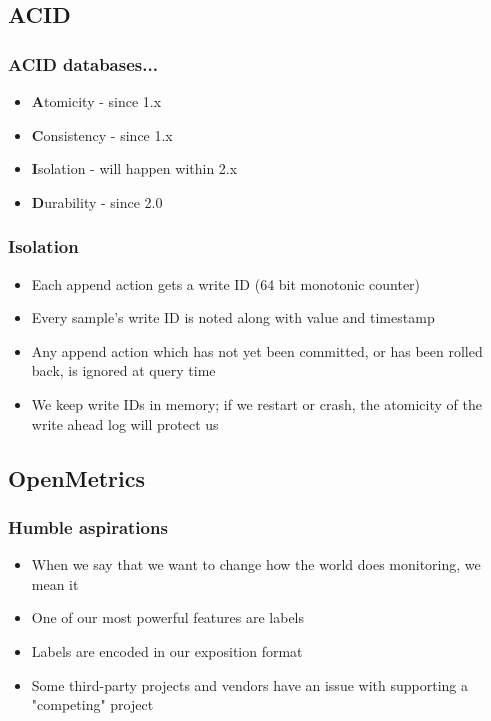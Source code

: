 \documentclass[aspectratio=169]{beamer}
\begin{document}
\subsection{ACID}

\begin{frame}
	\frametitle{ACID databases...}
	\begin{itemize}
		\item \textbf{A}tomicity - since 1.x
		\item \textbf{C}onsistency - since 1.x
		\item \textbf{I}solation - will happen within 2.x
		\item \textbf{D}urability - since 2.0
	\end{itemize}
\end{frame}

\begin{frame}
	\frametitle{Isolation}
	\begin{itemize}
		\item Each append action gets a write ID (64 bit monotonic counter)
		\item Every sample's write ID is noted along with value and timestamp
		\item Any append action which has not yet been committed, or has been rolled back, is ignored at query time
		\item We keep write IDs in memory; if we restart or crash, the atomicity of the write ahead log will protect us
	\end{itemize}
\end{frame}

\subsection{OpenMetrics}

\begin{frame}
	\frametitle{Humble aspirations}
	\begin{itemize}
		\item When we say that we want to change how the world does monitoring, we mean it
		\item One of our most powerful features are labels
		\item Labels are encoded in our exposition format
		\item Some third-party projects and vendors have an issue with supporting a "competing" project
	\end{itemize}
\end{frame}
\end{document}
